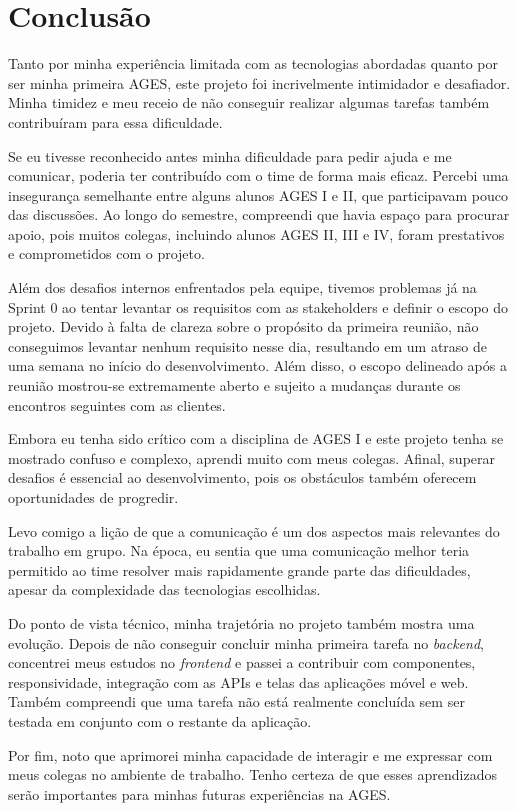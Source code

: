 \section[Conclusão]{Conclusão}

Tanto por minha experiência limitada com as tecnologias abordadas quanto por
ser minha primeira AGES, este projeto foi incrivelmente intimidador e
desafiador. Minha timidez e meu receio de não conseguir realizar algumas tarefas
também contribuíram para essa dificuldade.

Se eu tivesse reconhecido antes minha dificuldade para pedir ajuda e me
comunicar, poderia ter contribuído com o time de forma mais eficaz. Percebi uma
insegurança semelhante entre alguns alunos AGES I e II, que participavam pouco
das discussões. Ao longo do semestre, compreendi que havia espaço para procurar
apoio, pois muitos colegas, incluindo alunos AGES II, III e IV, foram
prestativos e comprometidos com o projeto.

Além dos desafios internos enfrentados pela equipe, tivemos problemas já na
Sprint 0 ao tentar levantar os requisitos com as stakeholders e definir o escopo
do projeto.
Devido à falta de clareza sobre o propósito da primeira reunião, não conseguimos
levantar nenhum requisito nesse dia, resultando em um atraso de uma semana no
início do desenvolvimento. Além disso, o escopo delineado após a reunião
mostrou-se extremamente aberto e sujeito a mudanças durante os encontros
seguintes com as clientes.

Embora eu tenha sido crítico com a disciplina de AGES I e este projeto tenha
se mostrado confuso e complexo, aprendi muito com meus colegas. Afinal,
superar desafios é essencial ao desenvolvimento,
pois os obstáculos também oferecem oportunidades de progredir.

Levo comigo a lição de que a comunicação é um dos aspectos mais relevantes do
trabalho em grupo. Na época, eu sentia que uma comunicação melhor teria
permitido ao time resolver mais rapidamente grande parte das dificuldades,
apesar da complexidade das tecnologias escolhidas.

Do ponto de vista técnico, minha trajetória no projeto também mostra uma
evolução. Depois de não conseguir concluir minha primeira tarefa no
\textit{backend}, concentrei meus estudos no \textit{frontend} e passei a
contribuir com componentes, responsividade, integração com as APIs e telas
das aplicações móvel e web. Também compreendi que uma tarefa não está realmente
concluída sem ser testada em conjunto com o restante da aplicação.

Por fim, noto que aprimorei minha capacidade de interagir e me expressar com
meus colegas no ambiente de trabalho. Tenho certeza de que esses aprendizados
serão importantes para minhas futuras experiências na AGES.
